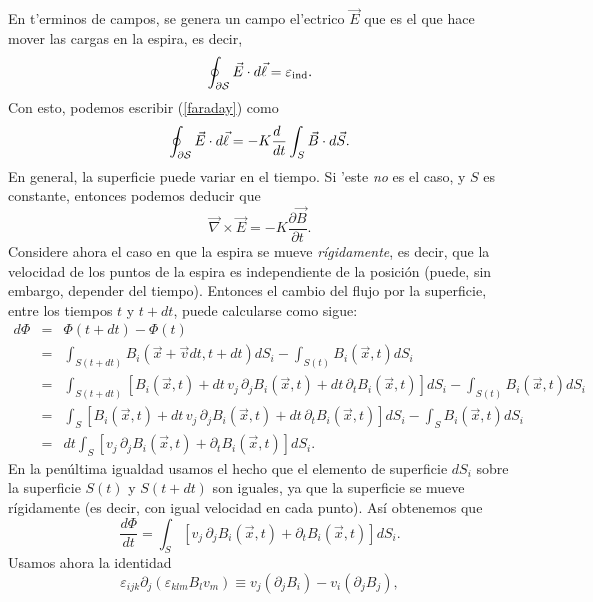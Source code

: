 En t'erminos de campos, se genera un campo el'ectrico $\vec{E}$ que es el que hace mover las cargas en la espira, es decir,
\begin{equation}
\oint_{\cal\partial S}\vec{E}\cdot d\vec{\ell}=\varepsilon_{\rm ind}.
\end{equation}
Con esto, podemos escribir (\ref{faraday}) como
\begin{equation}
\oint_{\cal \partial S}\vec{E}\cdot d\vec{\ell}=-K\frac{d\ }{dt}\int_S\vec{B}\cdot
d\vec{S}.
\end{equation}
En general, la superficie puede variar en el tiempo. Si 'este \textit{no} es el caso, y $S$
es constante, entonces podemos deducir que
\begin{equation}\label{ley-faraday0}
\vec\nabla\times\vec{E}=-K\frac{\partial\vec{B}}{\partial t}.
\end{equation}
Considere ahora el caso en que la espira se mueve \textit{rígidamente}, es decir, que la velocidad de los puntos de la espira es independiente de la posición (puede, sin embargo, depender del tiempo).
Entonces el cambio del flujo por la superficie, entre los tiempos $t$ y $t+dt$, puede calcularse como sigue:
\begin{eqnarray}
 d\Phi &=& \Phi(t+dt)-\Phi(t)\\
&=&
\int_{S(t+dt)}B_i(\vec{x}+\vec{v}dt,t+dt)dS_i-\int_{S(t)}B_i(\vec{x},t)dS_i\\
&=&\int_{S(t+dt)}\left[B_i(\vec{x},t)+dt\,v_j\,\partial_jB_i(\vec{x},
t)+dt\,\partial_tB_i(\vec{x},t)\right ] dS_i-\int_{S(t)}B_i(\vec{x},t)dS_i\\
&=&\int_S\left[B_i(\vec{x},t)+dt\,v_j\,\partial_jB_i(\vec{x},
t)+dt\,\partial_tB_i(\vec{x},t)\right ] dS_i-\int_SB_i(\vec{x},t)dS_i\\
&=&dt\int_S\left[v_j\,\partial_jB_i(\vec{x},t)+\partial_tB_i(\vec{x},t)\right
] dS_i.
\end{eqnarray}
En la penúltima igualdad usamos el hecho que el elemento de superficie $dS_i$ sobre la superficie $S(t)$ y $S(t+dt)$ son iguales, ya que la superficie se mueve rígidamente (es decir, con igual velocidad en cada punto). Así obtenemos que
\begin{equation}\label{dPhidt0}
 \frac{d\Phi}{dt}=\int_S\left[v_j\,\partial_jB_i(\vec{x},t)+\partial_tB_i(\vec
{x},t)\right] dS_i.
\end{equation}
Usamos ahora la identidad
\begin{equation}
\varepsilon_{ijk}\partial_j(\varepsilon_{klm}B_lv_m)\equiv
v_j(\partial_jB_i)-v_i(\partial_jB_j),
\end{equation}

